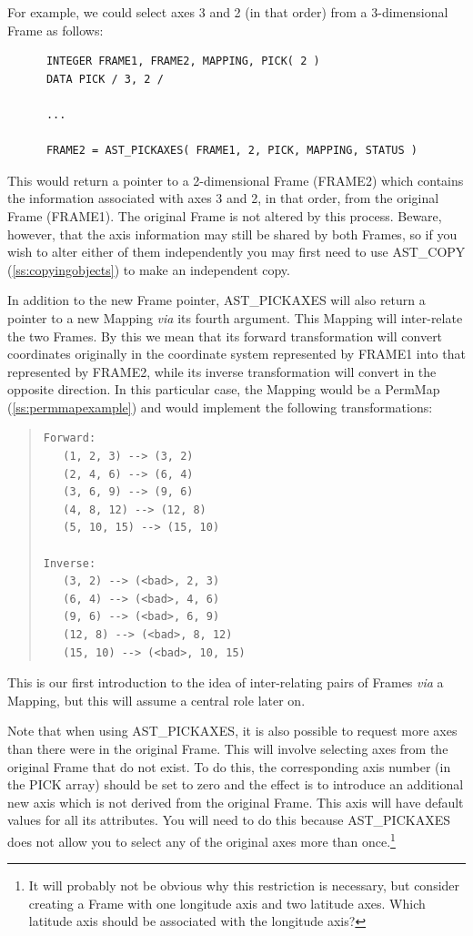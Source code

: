 \documentclass[twoside,11pt]{article}
\newcommand{\htmlref}[2]{#1}
\newcommand{\secref}[1]{\S\ref{#1}}
\renewcommand{\secref}[1]{\ref{#1}}
\begin{document}
For example, we could select axes 3 and 2 (in that order) from a
3-dimensional Frame as follows:

\small
\begin{verbatim}
      INTEGER FRAME1, FRAME2, MAPPING, PICK( 2 )
      DATA PICK / 3, 2 /

      ...

      FRAME2 = AST_PICKAXES( FRAME1, 2, PICK, MAPPING, STATUS )
\end{verbatim}
\normalsize

This would return a pointer to a 2-dimensional Frame (FRAME2) which
contains the information associated with axes 3 and 2, in that order,
from the original Frame (FRAME1). The original Frame is not altered by
this process. Beware, however, that the axis information may still be
shared by both Frames, so if you wish to alter either of them
independently you may first need to use \htmlref{AST\_COPY}{AST_COPY}
(\secref{ss:copyingobjects}) to make an independent copy.

In addition to the new Frame pointer, \htmlref{AST\_PICKAXES}{AST_PICKAXES} will also return a
pointer to a new \htmlref{Mapping}{Mapping} {\em{via}} its fourth argument. This Mapping will
inter-relate the two Frames. By this we mean that its forward
transformation will convert coordinates originally in the coordinate
system represented by FRAME1 into that represented by FRAME2, while
its inverse transformation will convert in the opposite direction. In
this particular case, the Mapping would be a \htmlref{PermMap}{PermMap}
(\secref{ss:permmapexample}) and would implement the following
transformations:

\begin{quote}
\begin{verbatim}
Forward:
   (1, 2, 3) --> (3, 2)
   (2, 4, 6) --> (6, 4)
   (3, 6, 9) --> (9, 6)
   (4, 8, 12) --> (12, 8)
   (5, 10, 15) --> (15, 10)

Inverse:
   (3, 2) --> (<bad>, 2, 3)
   (6, 4) --> (<bad>, 4, 6)
   (9, 6) --> (<bad>, 6, 9)
   (12, 8) --> (<bad>, 8, 12)
   (15, 10) --> (<bad>, 10, 15)
\end{verbatim}
\end{quote}

This is our first introduction to the idea of inter-relating pairs of
Frames {\em{via}} a Mapping, but this will assume a central role later on.

Note that when using AST\_PICKAXES, it is also possible to request
more axes than there were in the original Frame. This will involve
selecting axes from the original Frame that do not exist. To do this,
the corresponding axis number (in the PICK array) should be set to
zero and the effect is to introduce an additional new axis which is
not derived from the original Frame. This axis will have default
values for all its attributes. You will need to do this because
AST\_PICKAXES does not allow you to select any of the original axes
more than once.\footnote{It will probably not be obvious why this
restriction is necessary, but consider creating a Frame with one
longitude axis and two latitude axes. Which latitude axis should be
associated with the longitude axis?}
\end{document}
